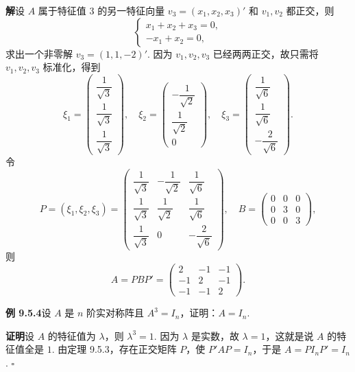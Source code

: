 \documentclass[UTF8,12pt,a4paper,fontset=fandol]{ctexart}
\begin{document}
\noindent\textbf{解}\quad 设 $A$ 属于特征值 $3$ 的另一特征向量 $v_3=(x_1,x_2,x_3)'$ 和 $v_1,v_2$ 都正交，则
\[
  \begin{cases}
    x_1+x_2+x_3=0,\\
    -x_1+x_2=0,
  \end{cases}
\]
求出一个非零解 $v_3=(1,1,-2)'$. 因为 $v_1,v_2,v_3$ 已经两两正交，故只需将 $v_1,v_2,v_3$ 标准化，得到
\[
  \xi_1=
  \left(\begin{array}{c}
    \dfrac1{\sqrt3}\\
    \dfrac1{\sqrt3}\\
    \dfrac1{\sqrt3}
  \end{array}\right),\quad
  \xi_2=
  \left(\begin{array}{c}
    -\dfrac1{\sqrt2}\\
    \dfrac1{\sqrt2}\\
    0
  \end{array}\right),\quad
  \xi_3=
  \left(\begin{array}{c}
    \dfrac1{\sqrt6}\\
    \dfrac1{\sqrt6}\\
    -\dfrac2{\sqrt6}
  \end{array}\right).
\]
令
\[
  P=(\xi_1,\xi_2,\xi_3)=
  \left(\begin{array}{ccc}
    \dfrac1{\sqrt3} & -\dfrac1{\sqrt2} & \dfrac1{\sqrt6}\\
    \dfrac1{\sqrt3} & \dfrac1{\sqrt2} & \dfrac1{\sqrt6}\\
    \dfrac1{\sqrt3} & 0 & -\dfrac2{\sqrt6}
  \end{array}\right),\quad
  B=
  \left(\begin{array}{ccc}
    0 & 0 & 0\\
    0 & 3 & 0\\
    0 & 0 & 3
  \end{array}\right),
\]
则
\[
  A=PBP'=
  \left(\begin{array}{ccc}
    2 & -1 & -1\\
    -1 & 2 & -1\\
    -1 & -1 & 2
  \end{array}\right).
\]

\noindent\textbf{例 9.5.4}\quad 设 $A$ 是 $n$ 阶实对称阵且 $A^3=I_n$，证明：$A=I_n$.

\noindent\textbf{证明}\quad 设 $A$ 的特征值为 $\lambda$，则 $\lambda^3=1$. 因为 $\lambda$ 是实数，故 $\lambda=1$，这就是说 $A$ 的特征值全是 $1$. 由定理 9.5.3，存在正交矩阵 $P$，使 $P'AP=I_n$，于是 $A=PI_nP'=I_n$. $\square$
\end{document}
